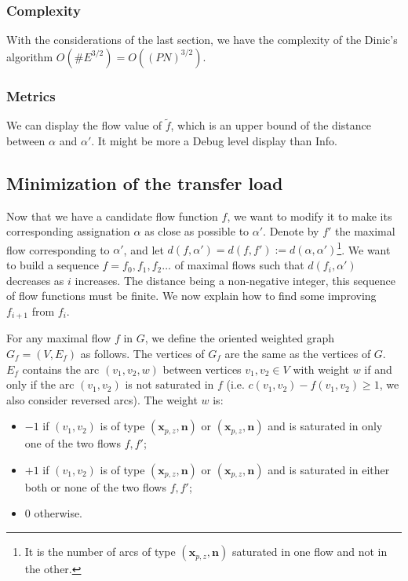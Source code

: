 \documentclass[]{article}
\begin{document}
\subsubsection*{Complexity}
With the considerations of the last section, we have the complexity of the Dinic's algorithm $O(\#E^{3/2}) = O((PN)^{3/2})$.

\subsubsection*{Metrics}

We can display the flow value of $\tilde{f}$, which is an upper bound of the distance between $\alpha$ and $\alpha'$. It might be more a Debug level display than Info.

\subsection{Minimization of the transfer load}

Now that we have a candidate flow function $f$, we want to modify it to make its corresponding assignation $\alpha$ as close as possible to $\alpha'$. Denote by $f'$ the maximal flow corresponding to $\alpha'$, and let $d(f, \alpha')=d(f, f'):=d(\alpha,\alpha')$\footnote{It is the number of arcs of type $(\mathbf{x}_{p,z},\mathbf{n})$ saturated in one flow and not in the other.}. 
We want to build a sequence $f=f_0, f_1, f_2 \dots$ of maximal flows such that $d(f_i, \alpha')$ decreases as $i$ increases. The distance being a non-negative integer, this sequence of flow functions must be finite. We now explain how to find some improving $f_{i+1}$ from $f_i$.

For any maximal flow $f$ in $G$, we define the oriented weighted graph $G_f=(V, E_f)$ as follows. The vertices of $G_f$ are the same as the vertices of $G$. $E_f$ contains the arc $(v_1,v_2, w)$ between vertices $v_1,v_2\in V$ with weight $w$ if and only if the arc $(v_1,v_2)$ is not saturated in $f$ (i.e. $c(v_1,v_2)-f(v_1,v_2) \ge 1$, we also consider reversed arcs). The weight $w$ is: 
\begin{itemize}
	\item  $-1$  if $(v_1,v_2)$ is of type $(\mathbf{x}_{p,z},\mathbf{n})$ or $(\mathbf{x}_{p,z},\mathbf{n})$ and is saturated in only one of the two flows $f,f'$;
	\item $+1$  if $(v_1,v_2)$ is of type $(\mathbf{x}_{p,z},\mathbf{n})$ or $(\mathbf{x}_{p,z},\mathbf{n})$ and is saturated in either both or none of the two flows $f,f'$;
	\item $0$ otherwise.
\end{itemize}
\end{document}
